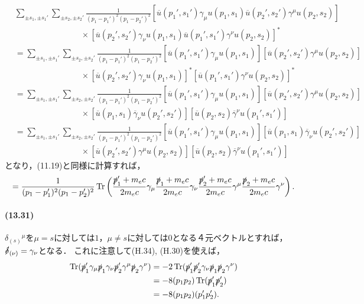 \begin{align*}
  & \sum_{\pm s_1, \pm s_1'} \sum_{\pm s_2, \pm s_2'} \frac{1}{(p_1-p_1')^2(p_1-p_2')^2} \left[ \overline{u}(p_1',s_1') \gamma_\mu u(p_1, s_1) \overline{u}(p_2',s_2') \gamma^\mu u(p_2, s_2) \right] \\
  &\qquad\qquad\qquad\qquad \times \left[ \overline{u}(p_2',s_2') \gamma_\nu u(p_1, s_1) \overline{u}(p_1',s_1') \gamma^\nu u(p_2, s_2) \right]^* \\
  & = \sum_{\pm s_1, \pm s_1'} \sum_{\pm s_2, \pm s_2'} \frac{1}{(p_1-p_1')^2(p_1-p_2')^2} \left[ \overline{u}(p_1',s_1') \gamma_\mu u(p_1, s_1) \right] \left[ \overline{u}(p_2',s_2') \gamma^\mu u(p_2, s_2) \right]\\
  &\qquad\qquad\qquad\qquad \times \left[ \overline{u}(p_2',s_2') \gamma_\nu u(p_1, s_1) \right]^* \left[ \overline{u}(p_1',s_1') \gamma^\nu u(p_2, s_2) \right]^* \\
  & = \sum_{\pm s_1, \pm s_1'} \sum_{\pm s_2, \pm s_2'} \frac{1}{(p_1-p_1')^2(p_1-p_2')^2} \left[ \overline{u}(p_1',s_1') \gamma_\mu u(p_1, s_1) \right] \left[ \overline{u}(p_2',s_2') \gamma^\mu u(p_2, s_2) \right] \\
  & \qquad\qquad\qquad\qquad \times \left[ \overline{u}(p_1,s_1) \overline{\gamma}_\nu u(p_2', s_2') \right] \left[ \overline{u}(p_2, s_2) \overline{\gamma}^\nu u(p_1', s_1') \right] \\
  & = \sum_{\pm s_1, \pm s_1'} \sum_{\pm s_2, \pm s_2'} \frac{1}{(p_1-p_1')^2(p_1-p_2')^2} \left[ \overline{u}(p_1',s_1') \gamma_\mu u(p_1, s_1) \right] \left[ \overline{u}(p_1,s_1) \overline{\gamma}_\nu u(p_2', s_2') \right] \\
  & \qquad\qquad\qquad\qquad \times \left[ \overline{u}(p_2',s_2') \gamma^\mu u(p_2, s_2) \right]  \left[ \overline{u}(p_2, s_2) \overline{\gamma}^\nu u(p_1', s_1') \right]
\end{align*}
となり，(11.19)と同様に計算すれば，
\[=\frac{1}{(p_1-p_1')^2(p_1-p_2')^2}\operatorname{Tr} \left( \frac{\slashed{p}_1'+m_ec}{2m_ec} \gamma_\mu \frac{\slashed{p}_1+m_ec}{2m_ec} \gamma_\nu  \frac{\slashed{p}_2'+m_ec}{2m_ec} \gamma^\mu \frac{\slashed{p}_2+m_ec}{2m_ec} \gamma^\nu \right). \]

\paragraph{(13.31)}
$\delta_{(s)}{}^\mu$を$\mu=s$に対しては$1$，$\mu\neq s$に対しては$0$となる４元ベクトルとすれば，$\slashed{\delta}_{(\nu)}=\gamma_\nu$となる．
これに注意して(H.34), (H.30)を使えば，
\begin{align*}
  \operatorname{Tr} (\slashed{p}_1' \gamma_\mu \slashed{p}_1 \gamma_\nu \slashed{p}_2' \gamma^\mu \slashed{p}_2 \gamma^\nu) & = -2\operatorname{Tr} (\slashed{p}_1' \slashed{p}_2' \gamma_\nu \slashed{p}_1 \slashed{p}_2 \gamma^\nu) \\
  & = -8(p_1p_2)\operatorname{Tr} (\slashed{p}_1' \slashed{p}_2' ) \\
  & = -8(p_1p_2)(p_1'p_2').
\end{align*}

